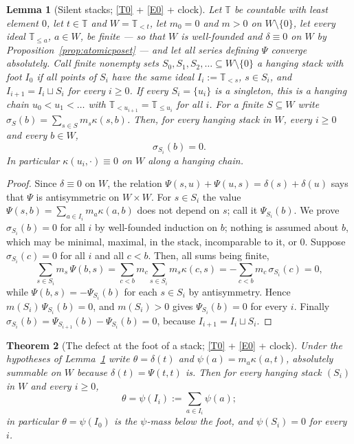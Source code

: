 \documentclass[11pt,a4paper]{article}
\theoremstyle{plain}
\newtheorem{theorem}{Theorem}[section]
\newtheorem{lemma}[theorem]{Lemma}
\theoremstyle{definition}
\theoremstyle{remark}
\newcommand{\T}{\mathbb{T}}                     %
\begin{document}
\begin{lemma}[Silent stacks; \eqref{T0} + \eqref{E0} + clock]
  \label{lem:silentstacks}
  Let $\T$ be countable with least element $0$, let $t \in \T$ and
  $W = \T_{<t}$, let $m_0 = 0$ and $m > 0$ on $W \setminus \{0\}$, let every
  ideal $\T_{\leq a}$, $a \in W$, be finite --- so that $W$ is well-founded
  and $\delta \equiv 0$ on $W$ by Proposition~\ref{prop:atomicposet} --- and
  let all series defining $\Psi$ converge absolutely.  Call finite nonempty
  sets $S_0, S_1, S_2, \dots \subseteq W \setminus \{0\}$ a \emph{hanging
  stack} with \emph{foot} $I_0$ if all points of $S_i$ have the same ideal
  $I_i := \T_{<s}$, $s \in S_i$, and $I_{i+1} = I_i \sqcup S_i$ for every
  $i \geq 0$.  If every $S_i = \{u_i\}$ is a singleton, this is a
  \emph{hanging chain} $u_0 < u_1 < \dots$ with
  $\T_{<u_{i+1}} = \T_{\leq u_i}$ for all $i$.  For a finite $S \subseteq W$
  write $\sigma_S(b) = \sum_{s \in S} m_s\kappa(s,b)$.  Then, for every
  hanging stack in $W$, every $i \geq 0$ and \emph{every} $b \in W$,
  \[
    \sigma_{S_i}(b) = 0 .
  \]
  In particular $\kappa(u_i,\cdot) \equiv 0$ on $W$ along a hanging chain.
\end{lemma}

\begin{proof}
  Since $\delta \equiv 0$ on $W$, the relation
  $\Psi(s,u) + \Psi(u,s) = \delta(s) + \delta(u)$ says that $\Psi$ is
  antisymmetric on $W \times W$.  For $s \in S_i$ the value
  $\Psi(s,b) = \sum_{a \in I_i} m_a\kappa(a,b)$ does not depend on $s$; call
  it $\Psi_{S_i}(b)$.  We prove $\sigma_{S_i}(b) = 0$ for all $i$ by
  well-founded induction on $b$; nothing is assumed about $b$, which may be
  minimal, maximal, in the stack, incomparable to it, or $0$.  Suppose
  $\sigma_{S_i}(c) = 0$ for all $i$ and all $c < b$.  Then, all sums being
  finite,
  \[
    \sum_{s \in S_i} m_s\,\Psi(b,s)
      = \sum_{c < b} m_c \sum_{s \in S_i} m_s\kappa(c,s)
      = -\sum_{c < b} m_c\,\sigma_{S_i}(c) = 0 ,
  \]
  while $\Psi(b,s) = -\Psi_{S_i}(b)$ for each $s \in S_i$ by antisymmetry.
  Hence $m(S_i)\,\Psi_{S_i}(b) = 0$, and $m(S_i) > 0$ gives
  $\Psi_{S_i}(b) = 0$ for every $i$.  Finally
  $\sigma_{S_i}(b) = \Psi_{S_{i+1}}(b) - \Psi_{S_i}(b) = 0$, because
  $I_{i+1} = I_i \sqcup S_i$.
\end{proof}

\begin{theorem}[The defect at the foot of a stack; \eqref{T0} + \eqref{E0} + clock]
  \label{thm:stackdefect}
  Under the hypotheses of Lemma~\ref{lem:silentstacks} write
  $\theta = \delta(t)$ and $\psi(a) = m_a\kappa(a,t)$, absolutely summable
  on $W$ because $\delta(t) = \Psi(t,t)$ is.  Then for every hanging stack
  $(S_i)$ in $W$ and every $i \geq 0$,
  \[
    \theta = \psi(I_i) := \sum_{a \in I_i} \psi(a) ;
  \]
  in particular $\theta = \psi(I_0)$ is the $\psi$-mass below the foot, and
  $\psi(S_i) = 0$ for every $i$.
\end{theorem}
\end{document}
